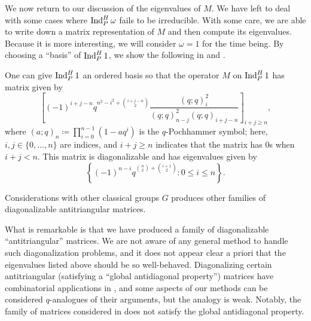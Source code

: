 \documentclass{amsart}
\begin{document}
We now return to our discussion of the eigenvalues of $M$. We have left to deal with some cases where $\operatorname{Ind}_P^H\omega$ fails to be irreducible. With some care, we are able to write down a matrix representation of $M$ and then compute its eigenvalues. Because it is more interesting, we will consider $\omega=1$ for the time being. By choosing a ``basis'' of $\operatorname{Ind}_P^H1$, we show the following in  and .
\begin{theorem} \label{thm:sln-eigens}
    One can give $\operatorname{Ind}_P^H1$ an ordered basis so that the operator $M$ on $\operatorname{Ind}_P^H1$ has matrix given by
    \[\left[(-1)^{i+j-n}q^{n^2-i^2+\binom{i+j-n}2}\frac{(q;q)_i^2}{(q;q)_{n-j}^2(q;q)_{i+j-n}}\right]_{i+j\ge n},\]
    where $(a;q)_n\coloneqq\prod_{i=0}^{n-1}\left(1-aq^i\right)$ is the $q$-Pochhammer symbol; here, $i,j\in\{0,\ldots,n\}$ are indices, and $i+j\ge n$ indicates that the matrix has $0$s when $i+j< n$. This matrix is diagonalizable and has eigenvalues given by
    \[\left\{(-1)^{n-i}q^{\binom n2+\binom{i+1}2}:0\le i\le n\right\}.\]
\end{theorem}
\begin{remark}
    Considerations with other classical groups $G$ produces other families of diagonalizable antitriangular matrices.
\end{remark}
What is remarkable is that we have produced a family of diagonalizable ``antitriangular'' matrices. We are not aware of any general method to handle such diagonalization problems, and it does not appear clear a priori that the eigenvalues listed above should be so well-behaved. Diagonalizing certain antitriangular (satisfying a ``global antidiagonal property'') matrices have combinatorial applications in \cite{britnell-antitriangular}, and some aspects of our methods can be considered $q$-analogues of their arguments, but the analogy is weak. Notably, the family of matrices considered in  does not satisfy the global antidiagonal property.

\end{document}
